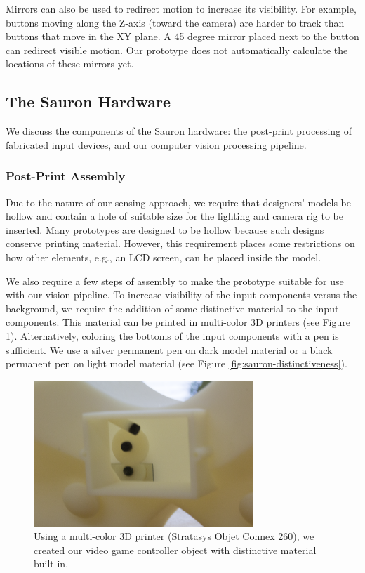 Mirrors can also be used to redirect motion to increase its visibility. For example, buttons moving along the Z-axis (toward the camera) are harder to track than buttons that move in the XY plane. A 45 degree mirror placed next to the button can redirect visible motion. Our prototype does not automatically calculate the locations of these mirrors yet.

    \subsection{The Sauron Hardware}
    
    We discuss the components of the Sauron hardware: the post-print processing of fabricated input devices, and our computer vision processing pipeline.

\subsubsection{Post-Print Assembly}
Due to the nature of our sensing approach, we require that designers' models be hollow and contain a hole of suitable size for the lighting and camera rig to be inserted. Many prototypes are designed to be hollow because such designs conserve printing material. However, this requirement places some restrictions on how other elements, e.g., an LCD screen, can be placed inside the model. 

We also require a few steps of assembly to make the prototype suitable for use with our vision pipeline.
To increase visibility of the input components versus the background, we require the addition of some distinctive material to the input components. This material can be printed in multi-color 3D printers (see Figure \ref{fig:sauron-objet}). Alternatively, coloring the bottoms of the input components with a pen is sufficient. We use a silver permanent pen on dark model material or a black permanent pen on light model material (see Figure \ref{fig:sauron-distinctiveness}).

\begin{figure}
\centering
\includegraphics[width=3.25in]{figures/sauron/objetback.png}
\caption{Using a multi-color 3D printer (Stratasys Objet Connex 260), we created our video game controller object with distinctive material built in.
}
\label{fig:sauron-objet}
\end{figure}

